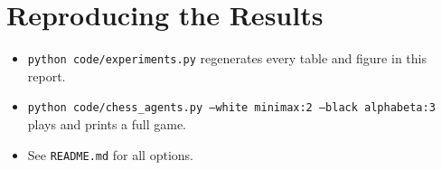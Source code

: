 \documentclass[11pt,a4paper]{article}
\begin{document}
\appendix
\section{Reproducing the Results}
\begin{itemize}
\item \texttt{python code/experiments.py} regenerates every table and figure in this report.
\item \texttt{python code/chess\_agents.py --white minimax:2 --black alphabeta:3} plays and prints a full game.
\item See \texttt{README.md} for all options.
\end{itemize}
\end{document}
